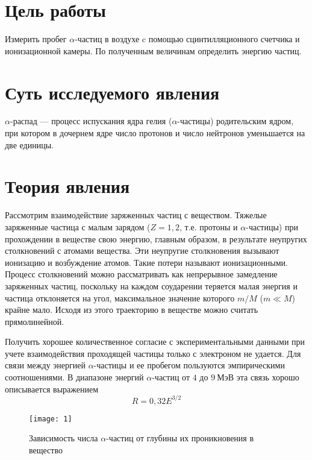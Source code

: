 \documentclass[a4paper, 12pt]{article}
\begin{document}


\section{Цель работы}
Измерить пробег $\alpha$-частиц в воздухе c помощью сцинтилляционного
счетчика и ионизационной камеры. По полученным величинам определить энергию частиц.





\section{Суть исследуемого явления}
$\alpha$-распад --- процесс испускания ядра гелия ($\alpha$-частицы)
родительским ядром, при котором в дочернем ядре число протонов и число
нейтронов уменьшается на две единицы.


\section{Теория явления}
Рассмотрим взаимодействие заряженных частиц с веществом. Тяжелые
заряженные частица с малым зарядом ($Z = 1, 2$, т.е. протоны и
$\alpha$-частицы) при прохождении в веществе свою энергию, главным
образом, в результате неупругих столкновений с атомами вещества. Эти
неупругие столкновения вызывают ионизацию и возбуждение атомов. Такие
потери называют ионизационными. Процесс столкновений можно
рассматривать как непрерывное замедление заряженных частиц, поскольку
на каждом соударении теряется малая энергия и частица отклоняется на
угол, максимальное значение которого $m/M$ ($m \ll M$) крайне мало.
Исходя из этого траекторию в веществе можно считать прямолинейной.

Получить хорошее количественное согласие с экспериментальными данными
при учете взаимодействия проходящей частицы только с электроном не
удается. Для связи между энергией $\alpha$-частицы и ее пробегом
пользуются эмпирическими соотношениями. В диапазоне энергий
$\alpha$-частиц от $4$ до $9\: \text{МэВ}$ эта связь хорошо
описывается выражением
\begin{equation}
    R = 0,32 E ^{3/2}
    \label{eq:1}
\end{equation}

\begin{wrapfigure}{r}{0.4\linewidth}
    \texttt{[image: 1]}
    \caption{Зависимость числа $\alpha$-час\-тиц от глубины их
    проникновения в вещество}
    \label{fig:1}
\end{wrapfigure}
\end{document}
